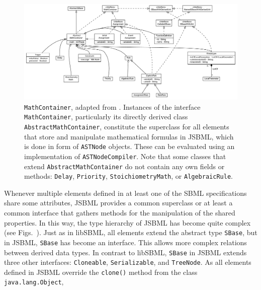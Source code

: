 \begin{figure}[htb]
 \centering
 \includegraphics[width=\textwidth]{img/MathContainer}
 \caption[\texttt{MathContainer}]{\texttt{MathContainer}, adapted from
 \citet{Draeger2011}. Instances of the interface \texttt{MathContainer},
 particularly its directly derived class \texttt{AbstractMathContainer},
 constitute the superclass for all elements that store and manipulate
 mathematical formulas in JSBML, which is done in form of \texttt{ASTNode}
 objects. These can be evaluated using an implementation of
 \texttt{ASTNodeCompiler}. Note that some classes that extend
 \texttt{AbstractMathContainer} do not contain any own fields or methods:
 \texttt{Delay}, \texttt{Priority}, \texttt{StoichiometryMath}, or
 \texttt{AlgebraicRule}.}
 \label{fig:MathContainerHierarchy}
\end{figure}
Whenever multiple elements defined in at least one of the SBML
%
specifications
%
share some attributes, JSBML
%
provides a common superclass or at least a common interface that gathers methods
for the manipulation of the shared properties. In this way, the type hierarchy
of JSBML
%
has become quite complex (see
Figs.~). Just as in
libSBML,
%
all elements extend the abstract type \texttt{SBase},
%
but in JSBML, \texttt{SBase} has become an interface. This allows more complex
relations between derived data types. In contrast to libSBML, \texttt{SBase} in
JSBML extends three other interfaces: \texttt{Cloneable}, \texttt{Serializable},
%
and \texttt{TreeNode}. As all elements defined in JSBML
%
override the \texttt{clone()} method from the class \texttt{java.lang.Object},
